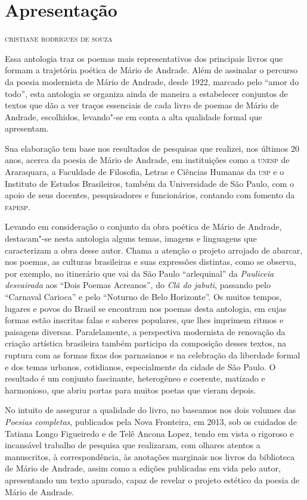 \chapter{Apresentação}

\begin{flushright}
\textsc{cristiane rodrigues de souza}
\end{flushright}
\bigskip

\noindent{}Essa antologia traz os poemas mais representativos dos principais livros que formam a trajetória poética de Mário de Andrade.
Além de assinalar o percurso da poesia modernista de Mário de Andrade,
desde 1922, marcado pelo ``amor do todo'', esta antologia
se organiza ainda de maneira a estabelecer conjuntos de textos que dão a
ver traços essenciais de cada livro de poemas de Mário de Andrade,
escolhidos, levando"-se em conta a alta qualidade formal que apresentam.

Sua elaboração tem base nos resultados de pesquisas que realizei, nos
últimos 20 anos, acerca da poesia de Mário de Andrade, em instituições
como a \textsc{unesp} de Araraquara, a Faculdade de Filosofia, Letras e Ciências
Humanas da \textsc{usp} e o Instituto de Estudos Brasileiros, também da
Universidade de São Paulo, com o apoio de seus docentes, pesquisadores e
funcionários, contando com fomento da \textsc{fapesp}.

Levando em consideração o conjunto da obra poética de Mário de Andrade,
destacam"-se nesta antologia alguns temas, imagens e linguagens que
caracterizam a obra desse autor. Chama a atenção o projeto arrojado de
abarcar, nos poemas, as culturas brasileiras e suas expressões
distintas, como se observa, por exemplo, no itinerário que vai da São
Paulo ``arlequinal'' da \emph{Pauliceia desvairada} aos ``Dois Poemas
Acreanos'', do \emph{Clã do jabuti}, passando pelo ``Carnaval Carioca''
e pelo ``Noturno de Belo Horizonte''. Os muitos tempos, lugares e povos
do Brasil se encontram nos poemas desta antologia, em cujas formas estão
inscritas falas e saberes populares, que lhes imprimem ritmos e
paisagens diversas. Paralelamente, a perspectiva modernista de
renovação da criação artística brasileira também participa da
composição desses textos, na ruptura com as formas fixas dos parnasianos
e na celebração da liberdade formal e dos temas urbanos, cotidianos,
especialmente da cidade de São Paulo. O resultado é um conjunto
fascinante, heterogêneo e coerente, matizado e harmonioso, que abriu
portas para muitos poetas que vieram depois.

No intuito de assegurar a qualidade do livro, no baseamos nos dois
volumes das \emph{Poesias completas}, publicados pela Nova Fronteira, em
2013, sob os cuidados de Tatiana Longo Figueiredo e de Telê Ancona
Lopez, tendo em vista o rigoroso e incansável trabalho de pesquisa que
realizaram, com olhares atentos a manuscritos, à correspondência, às
anotações marginais nos livros da biblioteca de Mário de Andrade, assim
como a edições publicadas em vida pelo autor, apresentando um texto
apurado, capaz de revelar o projeto estético da poesia de Mário de
Andrade.

